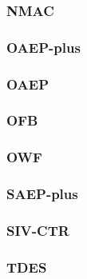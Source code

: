 \begin{frame}\frametitle{NMAC}
\begin{figure}
\begin{center}

\end{center}
\end{figure}
\end{frame}
\begin{frame}\frametitle{OAEP-plus}
\begin{figure}
\begin{center}

\end{center}
\end{figure}
\end{frame}
\begin{frame}\frametitle{OAEP}
\begin{figure}
\begin{center}

\end{center}
\end{figure}
\end{frame}
\begin{frame}\frametitle{OFB}
\begin{figure}
\begin{center}

\end{center}
\end{figure}
\end{frame}
\begin{frame}\frametitle{OWF}
\begin{figure}
\begin{center}

\end{center}
\end{figure}
\end{frame}
\begin{frame}\frametitle{SAEP-plus}
\begin{figure}
\begin{center}

\end{center}
\end{figure}
\end{frame}
\begin{frame}\frametitle{SIV-CTR}
\begin{figure}
\begin{center}

\end{center}
\end{figure}
\end{frame}
\begin{frame}\frametitle{TDES}
\begin{figure}
\begin{center}

\end{center}
\end{figure}
\end{frame}
